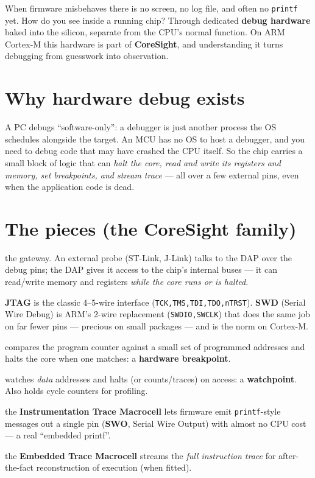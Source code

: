 \documentclass[11pt,a4paper,oneside]{book}
\newcommand{\code}[1]{\texttt{#1}}
\begin{document}
When firmware misbehaves there is no screen, no log file, and often no
\code{printf} yet. How do you see inside a running chip? Through dedicated
\textbf{debug hardware} baked into the silicon, separate from the CPU's normal
function. On ARM Cortex-M this hardware is part of \textbf{CoreSight}, and
understanding it turns debugging from guesswork into observation.

\section{Why hardware debug exists}
A PC debugs ``software-only'': a debugger is just another process the OS
schedules alongside the target. An MCU has no OS to host a debugger, and you
need to debug code that may have crashed the CPU itself. So the chip carries a
small block of logic that can \emph{halt the core, read and write its registers
and memory, set breakpoints, and stream trace} --- all over a few external pins,
even when the application code is dead.

\section{The pieces (the CoreSight family)}
\begin{description}[leftmargin=1.5cm,style=nextline]
  \item[Debug Access Port (DAP)] the gateway. An external probe (ST-Link,
        J-Link) talks to the DAP over the debug pins; the DAP gives it access to
        the chip's internal buses --- it can read/write memory and registers
        \emph{while the core runs or is halted}.
  \item[Debug pins: SWD vs JTAG] \textbf{JTAG} is the classic 4--5-wire
        interface (\code{TCK,TMS,TDI,TDO,nTRST}). \textbf{SWD} (Serial Wire
        Debug) is ARM's 2-wire replacement (\code{SWDIO,SWCLK}) that does the
        same job on far fewer pins --- precious on small packages --- and is the
        norm on Cortex-M.
  \item[Breakpoint Unit (FPB/BPU)] compares the program counter against a small
        set of programmed addresses and halts the core when one matches: a
        \textbf{hardware breakpoint}.
  \item[Data Watchpoint \& Trace (DWT)] watches \emph{data} addresses and halts
        (or counts/traces) on access: a \textbf{watchpoint}. Also holds cycle
        counters for profiling.
  \item[ITM / SWO] the \textbf{Instrumentation Trace Macrocell} lets firmware
        emit \code{printf}-style messages out a single pin (\textbf{SWO}, Serial
        Wire Output) with almost no CPU cost --- a real ``embedded printf''.
  \item[ETM] the \textbf{Embedded Trace Macrocell} streams the \emph{full
        instruction trace} for after-the-fact reconstruction of execution
        (when fitted).
\end{description}
\end{document}
